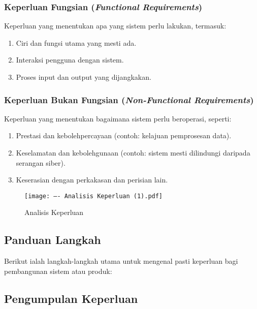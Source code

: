 \subsubsection{Keperluan Fungsian (\textit{Functional Requirements})}
Keperluan yang menentukan apa yang sistem perlu lakukan, termasuk:

\begin{enumerate}[label=\roman*.]
    \item Ciri dan fungsi utama yang mesti ada.
    \item Interaksi pengguna dengan sistem.
    \item Proses input dan output yang dijangkakan.\\


\end{enumerate}

\subsubsection{Keperluan Bukan Fungsian (\textit{Non-Functional Requirements})}

Keperluan yang menentukan bagaimana sistem perlu beroperasi, seperti:

\begin{enumerate}[label=\roman*.]
    \item Prestasi dan kebolehpercayaan (contoh: kelajuan pemprosesan data).

    \item Keselamatan dan kebolehgunaan (contoh: sistem mesti dilindungi daripada serangan siber).

    \item Keserasian dengan perkakasan dan perisian lain.
\end{enumerate}

\begin{figure}[h]
    \centering
    \texttt{[image: ---- Analisis Keperluan (1).pdf]}
    \caption{Analisis Keperluan}
    \label{fig:enteIIIlabel}
\end{figure}

\subsection{Panduan Langkah }


Berikut ialah langkah-langkah utama untuk mengenal pasti keperluan bagi pembangunan sistem atau produk:

\subsection{Pengumpulan Keperluan}


